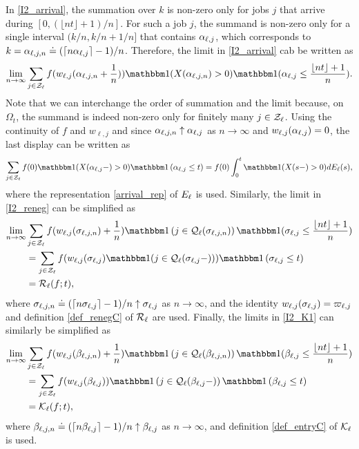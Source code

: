 \documentclass{article}
\theoremstyle{definition}
\numberwithin{equation}{section}
\begin{document}
In \eqref{I2_arrival}, the summation over $k$ is non-zero only for jobs $j$ that arrive during $[0,(\lfloor nt\rfloor+1)/n]$. For such a job $j$, the summand is non-zero only for a single interval $(k/n,k/n+1/n]$ that contains $\alpha_{\ell,j}$, which corresponds to $k=\alpha_{\ell,j,n}\doteq(\lceil n\alpha_{\ell,j}\rceil-1)/n$. Therefore, the limit in \eqref{I2_arrival} cab be written as
\begin{align*}
  \lim_{n\to\infty}\sum_{j\in\indexSet_\ell}f(w_{\ell,j}(\arrivaltime_{\ell,j,n}+\frac{1}{n})) \indicil{X(\arrivaltime_{\ell,j,n})>0}\indicil{\arrivaltime_{\ell,j}\leq\frac{\lfloor nt\rfloor+1}{n}}.
\end{align*}
Note that we can interchange the order of summation and the limit because, on $\Omega_t$, the summand is indeed non-zero only for finitely many $j\in\mathcal{Z}_\ell$. Using the continuity of $f $ and $w_{\ell,j}$ and since $\alpha_{\ell,j,n}\uparrow \alpha_{\ell,j}$ as $n\to\infty$ and $w_{\ell,j}(\alpha_{\ell,j})=0$, the last display can be written as
\[
  \sum_{j\in\indexSet_\ell}f(0)\indicil{X(\arrivaltime_{\ell,j}-)>0}\indic{\arrivaltime_{\ell,j}\leq t}= f(0)\int_0^t\indicil{X(s-)>0} d \arrival_{\ell}(s),
\]
where the representation \eqref{arrival_rep} of $E_\ell$ is used.
Similarly, the limit in \eqref{I2_reneg} can be simplified as
\begin{align*}
\lim_{n\to\infty}&\sum_{j\in\indexSet_\ell}f(w_{\ell,j}(\renegtime_{\ell,j,n})+\frac{1}{n})\indic{j\in\inque_\ell(\renegtime_{\ell,j,n})}\indicil{\renegtime_{\ell,j}\leq \frac{\lfloor nt\rfloor+1}{n}}\\
  &=  \sum_{j\in\indexSet_\ell} f(w_{\ell,j}(\renegtime_{\ell,j})\indicil{j\in\inque_\ell(\renegtime_{\ell,j}-)})\indic{\renegtime_{\ell,j}\leq t}\\
  & =\renegC_\ell(f;t),
\end{align*}
where $\sigma_{\ell,j,n}\doteq(\lceil n\sigma_{\ell,j}\rceil-1)/n\uparrow\sigma_{\ell,j}$ as $n\to\infty$, and the identity $w_{\ell,j}(\sigma_{\ell,j})=\varpi_{\ell,j}$ and definition \eqref{def_renegC} of $\mathcal{R}_\ell$ are used.
Finally, the limits in \eqref{I2_K1} can similarly be simplified as
\begin{align*}
  \lim_{n\to\infty}&\sum_{j\in\indexSet_\ell}f(w_{\ell,j}(\entrytime_{\ell,j,n})+\frac{1}{n})\indic{j\in\inque_\ell(\entrytime_{\ell,j,n})}\indicil{\entrytime_{\ell,j}\leq \frac{\lfloor nt\rfloor+1}{n}}\\
  &=  \sum_{j\in\indexSet_\ell} f(w_{\ell,j}(\entrytime_{\ell,j}))\indic{j\in\inque_\ell(\entrytime_{\ell,j}-)}\indic{\entrytime_{\ell,j}\leq t}\\
&  =\entryC_\ell(f;t),
\end{align*}
where $\beta_{\ell,j,n}\doteq(\lceil n\beta_{\ell,j}\rceil-1)/n\uparrow\beta_{\ell,j}$ as $n\to\infty$, and definition \eqref{def_entryC} of $\mathcal{K}_\ell$ is used.
\end{document}
